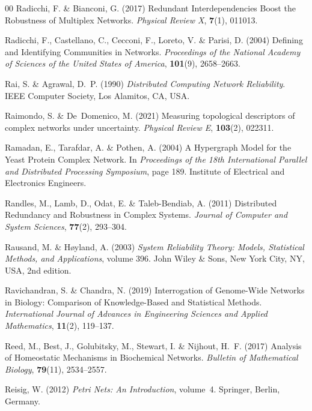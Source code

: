\documentclass{comnet-mod}
\begin{document}
\begin{thebibliography}{00}
Radicchi, F. {\&} Bianconi, G. (2017)  {Redundant Interdependencies Boost the
  Robustness of Multiplex Networks}. {\em {Physical Review X}}, \textbf{7}(1),
  011013.

Radicchi, F., Castellano, C., Cecconi, F., Loreto, V. {\&} Parisi, D. (2004)
  {Defining and Identifying Communities in Networks}. {\em {Proceedings of the
  National Academy of Sciences of the United States of America}},
  \textbf{101}(9), 2658--2663.

Rai, S. {\&} Agrawal, D.~P. (1990) {\em {Distributed Computing Network
  Reliability}}.
{IEEE Computer Society}, Los Alamitos, CA, USA.

Raimondo, S. {\&} De~Domenico, M. (2021)  Measuring topological descriptors of
  complex networks under uncertainty. {\em {Physical Review E}},
  \textbf{103}(2), 022311.

Ramadan, E., Tarafdar, A. {\&} Pothen, A. (2004)  {A Hypergraph Model for the
  Yeast Protein Complex Network}. In {\em {Proceedings of the 18th
  International Parallel and Distributed Processing Symposium}}, page 189.
  {Institute of Electrical and Electronics Engineers}.

Randles, M., Lamb, D., Odat, E. {\&} {Taleb-Bendiab}, A. (2011)  {Distributed
  Redundancy and Robustness in Complex Systems}. {\em {Journal of Computer and
  System Sciences}}, \textbf{77}(2), 293--304.

Rausand, M. {\&} H{\o}yland, A. (2003) {\em {System Reliability Theory:
  {{Models}}, Statistical Methods, and Applications}}, volume 396.
{John Wiley \& Sons}, {New York City, NY, USA}, 2nd edition.

Ravichandran, S. {\&} Chandra, N. (2019)  {Interrogation of Genome-Wide
  Networks in Biology: {{Comparison}} of Knowledge-Based and Statistical
  Methods}. {\em {International Journal of Advances in Engineering Sciences and
  Applied Mathematics}}, \textbf{11}(2), 119--137.

Reed, M., Best, J., Golubitsky, M., Stewart, I. {\&} Nijhout, H.~F. (2017)
  {Analysis of Homeostatic Mechanisms in Biochemical Networks}. {\em {Bulletin
  of Mathematical Biology}}, \textbf{79}(11), 2534--2557.

Reisig, W. (2012) {\em {Petri Nets: An Introduction}}, volume~4.
{Springer}, {Berlin, Germany}.


\end{thebibliography}
\end{document}
